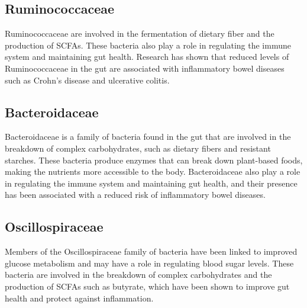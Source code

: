 \documentclass[
]{article}
\begin{document}
\subsection{Ruminococcaceae}

\begin{small}
Ruminococcaceae are involved in the fermentation of dietary fiber and the 
production of SCFAs. These bacteria also play a role in regulating the immune 
system and maintaining gut health. Research has shown that reduced levels of 
Ruminococcaceae in the gut are associated with inflammatory bowel diseases such 
as Crohn's disease and ulcerative colitis.
\end{small}

\subsection{Bacteroidaceae}

\begin{small}
Bacteroidaceae is a family of bacteria found in the gut that are involved in the
breakdown of complex carbohydrates, such as dietary fibers and resistant 
starches. These bacteria produce enzymes that can break down plant-based foods, 
making the nutrients more accessible to the body. Bacteroidaceae also play a 
role in regulating the immune system and maintaining gut health, and their 
presence has been associated with a reduced risk of inflammatory bowel diseases.
\end{small}

\subsection{Oscillospiraceae}

\begin{small}
Members of the Oscillospiraceae family of bacteria have been linked to improved 
glucose metabolism and may have a role in regulating blood sugar levels. These 
bacteria are involved in the breakdown of complex carbohydrates and the 
production of SCFAs such as butyrate, which have been shown to improve gut 
health and protect against inflammation.
\end{small}
\end{document}
